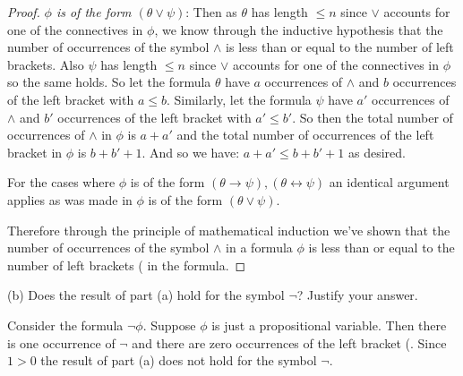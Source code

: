 \documentclass{article}
\begin{document}
\begin{proof}
    \textit{$\phi$ is of the form $(\theta \lor \psi)$}: Then as $\theta$ has length $\leq n$ since $\lor$ accounts for one of the connectives in $\phi$, we know through the inductive hypothesis that the number of occurrences of the symbol $\land$ is less than or equal to the number of left brackets. Also $\psi$ has length $\leq n$ since $\lor$ accounts for one of the connectives in $\phi$ so the same holds. So let the formula $\theta$ have $a$ occurrences of $\land$ and $b$ occurrences of the left bracket with $a \leq b$. Similarly, let the formula $\psi$ have $a'$ occurrences of $\land$ and $b'$ occurrences of the left bracket with $a' \leq b'$. So then the total number of occurrences of $\land$ in $\phi$ is $a + a'$ and the total number of occurrences of the left bracket in $\phi$ is $b + b' + 1$. And so we have: $a + a' \leq b + b' + 1$ as desired.

    For the cases where $\phi$ is of the form $(\theta \rightarrow \psi), (\theta \leftrightarrow \psi)$ an identical argument applies as was made in $\phi$ is of the form $(\theta \lor \psi)$.

    Therefore through the principle of mathematical induction we've shown that the number of occurrences of the symbol $\land$ in a formula $\phi$ is less than or equal to the number of left brackets ( in the formula.
\end{proof}

(b) Does the result of part (a) hold for the symbol $\neg$? Justify your answer.

Consider the formula $\neg \phi$. Suppose $\phi$ is just a propositional variable. Then there is one occurrence of $\neg$ and there are zero occurrences of the left bracket (. Since $1 > 0$ the result of part (a) does not hold for the symbol $\neg$.
\end{document}
